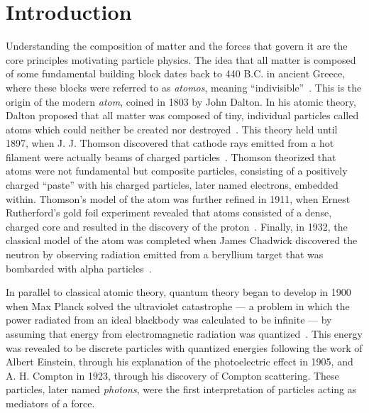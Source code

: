 
\chapter{Introduction}
\label{chap:intro}
Understanding the composition of matter and the forces that govern it are the core principles motivating particle physics. The idea that all matter is composed of some fundamental building block dates back to 440 B.C. in ancient Greece, where these blocks were referred to as \textit{atomos}, meaning ``indivisible''~\cite{wolfgang2019}. This is the origin of the modern \textit{atom}, coined in 1803 by John Dalton. In his atomic theory, Dalton proposed that all matter was composed of tiny, individual particles called atoms which could neither be created nor destroyed~\cite{oed_physics}. This theory held until 1897, when J. J. Thomson discovered that cathode rays emitted from a hot filament were actually beams of charged particles~\cite{thomson_electron}. Thomson theorized that atoms were not fundamental but composite particles, consisting of a positively charged ``paste'' with his charged particles, later named electrons, embedded within. Thomson's model of the atom was further refined in 1911, when Ernest Rutherford's gold foil experiment revealed that atoms consisted of a dense, charged core and resulted in the discovery of the proton~\cite{rutherford}. Finally, in 1932, the classical model of the atom was completed when James Chadwick discovered the neutron by observing radiation emitted from a beryllium target that was bombarded with alpha particles~\cite{chadwick}.

In parallel to classical atomic theory, quantum theory began to develop in 1900 when Max Planck solved the ultraviolet catastrophe --- a problem in which the power radiated from an ideal blackbody was calculated to be infinite --- by assuming that energy from electromagnetic radiation was quantized~\cite{kittel1980thermal}. This energy was revealed to be discrete particles with quantized energies following the work of Albert Einstein, through his explanation of the photoelectric effect in 1905, and A. H. Compton in 1923, through his discovery of Compton scattering. These particles, later named \textit{photons}, were the first interpretation of particles acting as mediators of a force.

